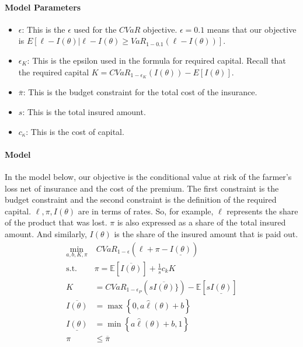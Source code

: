\documentclass[11pt]{article}
\begin{document}
  \paragraph*{Model Parameters}
  \begin{itemize}
    \item $\epsilon$: This is the $\epsilon$ used for the $CVaR$ objective.  $\epsilon = 0.1$ means that our objective is $E[\ell - I(\theta)|\ell -I(\theta) \geq VaR_{1-0.1}\left ( \ell - I(\theta) \right )]$. 
    \item $\epsilon_K$: This is the epsilon used in the formula for required capital. Recall that the required capital $K = CVaR_{1-\epsilon_K}(I(\theta)) - E[I(\theta)]$.
    \item $\overline{\pi}$: This is the budget constraint for the total cost of the insurance. 
    \item $s$: This is the total insured amount.
    \item $c_{\kappa}$: This is the cost of capital. 
\end{itemize}
  
  \paragraph*{Model}
  In the model below, our objective is the conditional value at risk of the farmer's loss net of insurance and the cost of the premium. The first constraint is the budget constraint and the second constraint is the definition of the required capital. $\ell, \pi, I(\theta)$ are in terms of rates. So, for example, $\ell$ represents the share of the product that was lost. $\pi$ is also expressed as a share of the total insured amount. And similarly, $I(\theta)$ is the share of the insured amount that is paid out. 
  \begin{align}
    \min_{a,b,K,\pi} &\ CVaR_{1-\epsilon}\left(\ell + \pi  -  \underline{I(\theta)} \right)\\
    \text{s.t.   } & \pi = \mathbb{E} \left [ \overline{I(\theta)} \right ] + \frac{1}{s}c_k K\\
    K &= CVaR_{1-\epsilon_P} \left( s\overline{I(\theta)} \} \right) - \mathbb{E}\left [ s\underline{I(\theta)} \right ]\\
    \overline{I(\theta)} &= \max \left \{0,a\hat{\ell}(\theta) + b \right \}\\
    \underline{I(\theta)} &= \min \left \{a\hat{\ell}(\theta)+b,1 \right \}\\
    \pi &\leq \overline{\pi}
\end{align}
\end{document}
